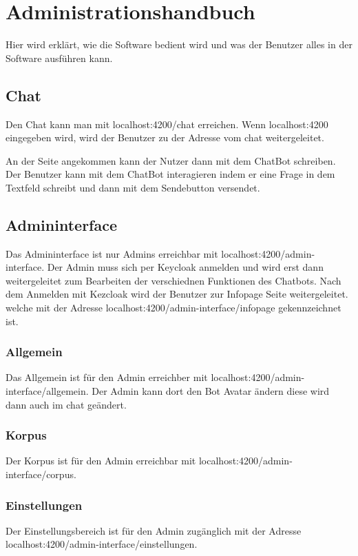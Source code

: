 \section{Administrationshandbuch}
Hier wird erklärt, wie die Software bedient wird und was der Benutzer alles 
in der Software ausführen kann.

\subsection{Chat}
Den Chat kann man mit localhost:4200/chat erreichen. Wenn localhost:4200
eingegeben wird, wird der Benutzer zu der Adresse vom chat weitergeleitet.

An der Seite angekommen kann der Nutzer dann mit dem ChatBot schreiben. 
Der Benutzer kann mit dem ChatBot interagieren indem er eine Frage in dem Textfeld schreibt
und dann mit dem Sendebutton versendet.

\subsection{Admininterface}
Das Admininterface ist nur Admins erreichbar mit localhost:4200/admin-interface. Der Admin muss sich per Keycloak
anmelden und wird erst dann weitergeleitet zum Bearbeiten der verschiednen Funktionen
des Chatbots.
Nach dem Anmelden mit Kezcloak wird der Benutzer zur Infopage Seite weitergeleitet.
welche mit der Adresse localhost:4200/admin-interface/infopage gekennzeichnet ist.

\subsubsection{Allgemein}
Das Allgemein ist für den Admin erreichber mit localhost:4200/admin-interface/allgemein. 
Der Admin kann dort den Bot Avatar ändern diese wird dann auch im chat geändert.

\subsubsection{Korpus}
Der Korpus ist für den Admin erreichbar mit localhost:4200/admin-interface/corpus.

\subsubsection{Einstellungen}
Der Einstellungsbereich ist für den Admin zugänglich mit der Adresse 
localhost:4200/admin-interface/einstellungen.